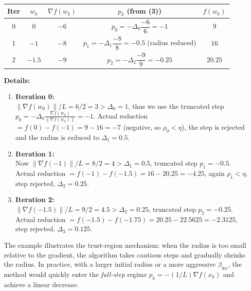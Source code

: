 \documentclass[11pt]{article}
\begin{document}
\begin{center}
\begin{tabular}{c|c|c|c|c}
\textbf{Iter} & $w_{k}$ & $\nabla f(w_{k})$ & $p_{k}$ (from (3)) & $f(w_{k})$\\ \hline
0 & $0$ & $-6$ & $p_{0}= -\Delta_{0}\dfrac{-6}{6}= -1$ & $9$\\
1 & $-1$ & $-8$ & $p_{1}= -\Delta_{1}\dfrac{-8}{8}= -0.5$ (radius reduced) & $16$\\
2 & $-1.5$ & $-9$ & $p_{2}= -\Delta_{2}\dfrac{-9}{9}= -0.25$ & $20.25$
\end{tabular}
\end{center}

\textbf{Details:}
\begin{enumerate}[label=Iter \arabic*:]
\item \textbf{Iteration 0:}\\
$\| \nabla f(w_{0})\|/L=6/2=3>\Delta_{0}=1$, thus we use the truncated step
$p_{0}=-\Delta_{0}\frac{\nabla f(w_{0})}{\|\nabla f(w_{0})\|}= -1$.
Actual reduction $=f(0)-f(-1)=9-16=-7$ (negative, so $\rho_{0}<\eta$),
the step is rejected and the radius is reduced to $\Delta_{1}=0.5$.

\item \textbf{Iteration 1:}\\
Now $\| \nabla f(-1)\|/L=8/2=4>\Delta_{1}=0.5$, truncated step $p_{1}=-0.5$.
Actual reduction $=f(-1)-f(-1.5)=16-20.25=-4.25$, again $\rho_{1}<\eta$, step rejected,
$\Delta_{2}=0.25$.

\item \textbf{Iteration 2:}\\
$\| \nabla f(-1.5)\|/L=9/2=4.5>\Delta_{2}=0.25$, truncated step $p_{2}=-0.25$.
Actual reduction $=f(-1.5)-f(-1.75)=20.25-22.5625=-2.3125$, step rejected,
$\Delta_{3}=0.125$.
\end{enumerate}
The example illustrates the trust‑region mechanism: when the radius is too small
relative to the gradient, the algorithm takes cautious steps and gradually
shrinks the radius. In practice, with a larger initial radius or a more
aggressive $\beta_{\text{inc}}$, the method would quickly enter the \emph{full‑step}
regime $p_{k}=-(1/L)\nabla f(x_{k})$ and achieve a linear decrease.

\end{document}

